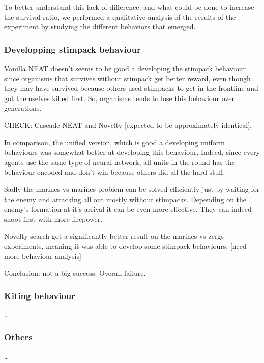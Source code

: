 To better understand this lack of difference, and what could be done
to increase the survival ratio, we performed a qualitative analysis of the
results of the experiment by studying the different behaviors that emerged.

\subsubsection{Developping stimpack behaviour}

Vanilla NEAT doesn’t seems to be good a developing the stimpack behaviour since organisms
that survives without stimpack get better reward,
even though they may have survived because others used stimpacks to get in the frontline
and got themselves killed first.
So, organisms tends to lose this behaviour over generations.

CHECK: Cascade-NEAT and Novelty [expected to be approximately identical].

In comparison, the unified version, which is good a developing uniform behaviours
was somewhat better at developing this behaviour.
Indeed, since every agents use the same type of neural network, all units in the round
has the behaviour encoded and don’t win because others
did all the hard stuff.

Sadly the marines vs marines problem can be solved efficiently just by waiting for the
enemy and attacking all out mostly without stimpacks.
Depending on the enemy’s formation at it’s arrival it can be even more effective.
They can indeed shoot first with more firepower.

Novelty search got a significantly better result on the marines vs zergs experiments,
meaning it was able to develop some stimpack behaviours. [need more behaviour analysis]

Conclusion: not a big success. Overall failure.

\subsubsection{Kiting behaviour}

…


\subsubsection{Others}

…




